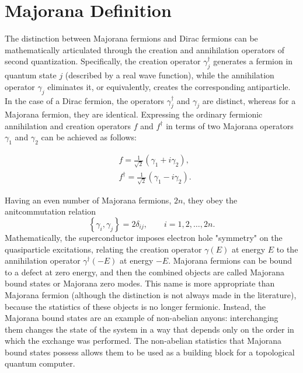 \documentclass{article}
\begin{document}
\section{Majorana Definition} %
\label{sec:Majorana Definition}
The distinction between Majorana fermions and Dirac fermions can be mathematically articulated through the creation and annihilation operators of second quantization. Specifically, the creation operator $\gamma_j^{\dagger}$ generates a fermion in quantum state $j$ (described by a real wave function), while the annihilation operator $\gamma_j$ eliminates it, or equivalently, creates the corresponding antiparticle. In the case of a Dirac fermion, the operators $\gamma_j^{\dagger}$ and $\gamma_j$ are distinct, whereas for a Majorana fermion, they are identical. Expressing the ordinary fermionic annihilation and creation operators $f$ and $f^{\dagger}$ in terms of two Majorana operators $\gamma_1$ and $\gamma_2$ can be achieved as follows:

$$
	\begin{aligned}
		 & f=\frac{1}{\sqrt{2}}\left(\gamma_1+i \gamma_2\right),            \\
		 & f^{\dagger}=\frac{1}{\sqrt{2}}\left(\gamma_1-i \gamma_2\right) .
	\end{aligned}
$$

Having an even number of Majorana fermions, $ 2n $, they obey the anitcommutation relation
\begin{equation}
	\left\{\gamma_i, \gamma_j\right\}=2 \delta_{i j}, \qquad i=1, 2, \dots, 2n  .
\end{equation}
Mathematically, the superconductor imposes electron hole "symmetry" on the quasiparticle excitations, relating the creation operator $\gamma(E)$ at energy $E$ to the annihilation operator $\gamma^{\dagger}(-E)$ at energy $-E$.\cite{Majorana-returns} Majorana fermions can be bound to a defect at zero energy, and then the combined objects are called Majorana bound states or Majorana zero modes. This name is more appropriate than Majorana fermion (although the distinction is not always made in the literature), because the statistics of these objects is no longer fermionic. Instead, the Majorana bound states are an example of non-abelian anyons: interchanging them changes the state of the system in a way that depends only on the order in which the exchange was performed. The non-abelian statistics that Majorana bound states possess allows them to be used as a building block for a topological quantum computer.
\end{document}
